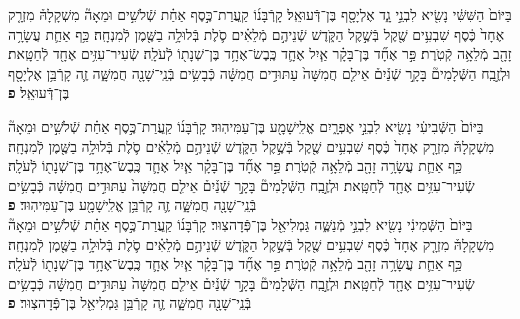 \documentclass[twoside, openany, parskip=half, 11pt]{book}
\begin{document}
\begin{footnotesize}
\begin{multicols}{2}

בַּיּוֹם֙ הַשִּׁשִּׁ֔י נָשִׂ֖יא לִבְנֵ֣י גָ֑ד אֶלְיָסָ֖ף בֶּן־דְּֿעוּאֵֽל׃ קָרְֿבָּנ֜וֹ קַֽעֲרַת־כֶּ֣סֶף אַחַ֗ת שְֿׁלֹשִׁ֣ים וּמֵאָה֘ מִשְׁקָלָהּ֒ מִזְרָ֤ק אֶחָד֙ כֶּ֔סֶף שִׁבְעִ֥ים שֶׁ֖קֶל בְּֿשֶׁ֣קֶל הַקֹּ֑דֶשׁ שְֿׁנֵיהֶ֣ם מְֿלֵאִ֗ים סֹ֛לֶת בְּֿלוּלָ֥ה בַשֶּׁ֖מֶן לְֿמִנְחָֽה׃ כַּ֥ף אַחַ֛ת עֲשָׂרָ֥ה זָהָ֖ב מְֿלֵאָ֥ה קְֿטֹֽרֶת׃ פַּ֣ר אֶחָ֞ד בֶּן־בָּקָ֗ר אַ֧יִל אֶחָ֛ד כֶּֽבֶשׂ־אֶחָ֥ד בֶּן־שְׁנָת֖וֹ לְֿעֹלָֽה׃ שְֿׂעִיר־עִזִּ֥ים אֶחָ֖ד לְֿחַטָּֽאת׃ וּלְזֶ֣בַֽח הַשְּֿׁלָמִים֘ בָּקָ֣ר שְֿׁנַ֒יִם֒ אֵילִ֤ם חֲמִשָּׁה֙ עַתּוּדִ֣ים חֲמִשָּׁ֔ה כְּֿבָשִׂ֥ים בְּֿנֵֽי־שָׁנָ֖ה חֲמִשָּׁ֑ה זֶ֛ה קָרְֿבַּ֥ן אֶלְיָסָ֖ף בֶּן־דְּֿעוּאֵֽל׃ \textbf{פ}


בַּיּוֹם֙ הַשְּֿׁבִיעִ֔י נָשִׂ֖יא לִבְנֵ֣י אֶפְרָ֑יִם אֱלִֽישָׁמָ֖ע בֶּן־עַמִּיהֽוּד׃ קָרְֿבָּנ֜וֹ קַֽעֲרַת־כֶּ֣סֶף אַחַ֗ת שְֿׁלֹשִׁ֣ים וּמֵאָה֘ מִשְׁקָלָהּ֒ מִזְרָ֤ק אֶחָד֙ כֶּ֔סֶף שִׁבְעִ֥ים שֶׁ֖קֶל בְּֿשֶׁ֣קֶל הַקֹּ֑דֶשׁ שְֿׁנֵיהֶ֣ם מְֿלֵאִ֗ים סֹ֛לֶת בְּֿלוּלָ֥ה בַשֶּׁ֖מֶן לְֿמִנְחָֽה׃ כַּ֥ף אַחַ֛ת עֲשָׂרָ֥ה זָהָ֖ב מְֿלֵאָ֥ה קְֿטֹֽרֶת׃  פַּ֣ר אֶחָ֞ד בֶּן־בָּקָ֗ר אַ֧יִל אֶחָ֛ד כֶּֽבֶשׂ־אֶחָ֥ד בֶּן־שְׁנָת֖וֹ לְֿעֹלָֽה׃ שְֿׂעִיר־עִזִּ֥ים אֶחָ֖ד לְֿחַטָּֽאת׃ וּלְזֶ֣בַֽח הַשְּֿׁלָמִים֘ בָּקָ֣ר שְֿׁנַ֒יִם֒ אֵילִ֤ם חֲמִשָּׁה֙ עַתּוּדִ֣ים חֲמִשָּׁ֔ה כְּֿבָשִׂ֥ים בְּֿנֵֽי־שָׁנָ֖ה חֲמִשָּׁ֑ה זֶ֛ה קָרְֿבַּ֥ן אֱלִֽישָׁמָ֖ע בֶּן־עַמִּיהֽוּד׃ \textbf{פ}
 \\
 בַּיּוֹם֙ הַשְּֿׁמִינִ֔י נָשִׂ֖יא לִבְנֵ֣י מְֿנַשֶּׁ֑ה גַּמְלִיאֵ֖ל בֶּן־פְּֿדָהצֽוּר׃ קָרְֿבָּנ֜וֹ קַֽעֲרַת־כֶּ֣סֶף אַחַ֗ת שְֿׁלֹשִׁ֣ים וּמֵאָה֘ מִשְׁקָלָהּ֒ מִזְרָ֤ק אֶחָד֙ כֶּ֔סֶף שִׁבְעִ֥ים שֶׁ֖קֶל בְּֿשֶׁ֣קֶל הַקֹּ֑דֶשׁ שְֿׁנֵיהֶ֣ם מְֿלֵאִ֗ים סֹ֛לֶת בְּֿלוּלָ֥ה בַשֶּׁ֖מֶן לְֿמִנְחָֽה׃ כַּ֥ף אַחַ֛ת עֲשָׂרָ֥ה זָהָ֖ב מְֿלֵאָ֥ה קְֿטֹֽרֶת׃ פַּ֣ר אֶחָ֞ד בֶּן־בָּקָ֗ר אַ֧יִל אֶחָ֛ד כֶּֽבֶשׂ־אֶחָ֥ד בֶּן־שְׁנָת֖וֹ לְֿעֹלָֽה׃ שְֿׂעִיר־עִזִּ֥ים אֶחָ֖ד לְֿחַטָּֽאת׃ וּלְזֶ֣בַֽח הַשְּֿׁלָמִים֘ בָּקָ֣ר שְֿׁנַ֒יִם֒ אֵילִ֤ם חֲמִשָּׁה֙ עַתּוּדִ֣ים חֲמִשָּׁ֔ה כְּֿבָשִׂ֥ים בְּֿנֵֽי־שָׁנָ֖ה חֲמִשָּׁ֑ה זֶ֛ה קָרְֿבַּ֥ן גַּמְלִיאֵ֖ל בֶּן־פְּֿדָהצֽוּר׃ \textbf{פ}



\end{multicols}
\end{footnotesize}
\end{document}
